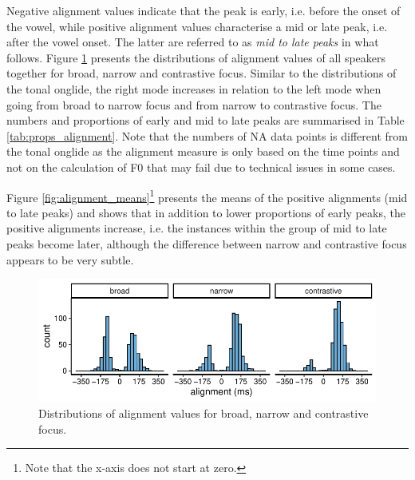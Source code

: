 Negative alignment values indicate that the peak is early, i.e. before the onset of the vowel, while positive alignment values characterise a mid or late peak, i.e. after the vowel onset. The latter are referred to as \emph{mid to late peaks} in what follows. Figure \ref{fig:alignment_distributions_within} presents the distributions of alignment values of all speakers together for broad, narrow and contrastive focus. Similar to the distributions of the tonal onglide, the right mode increases in relation to the left mode when going from broad to narrow focus and from narrow to contrastive focus. The numbers and proportions of early and mid to late peaks are summarised in Table \ref{tab:props_alignment}. Note that the numbers of NA data points is different from the tonal onglide as the alignment measure is only based on the time points and not on the calculation of F0 that may fail due to technical issues in some cases.

Figure \ref{fig:alignment_means}\footnote{Note that the x-axis does not start at zero.} presents the means of the positive alignments (mid to late peaks) and shows that in addition to lower proportions of early peaks, the positive alignments increase, i.e. the instances within the group of mid to late peaks become later, although the difference between narrow and contrastive focus appears to be very subtle.

\begin{figure}[htbp]
\begin{center}
\includegraphics[width=\textwidth]{figures/ch6/alignment_distribution_within.pdf}
\caption{Distributions of alignment values for broad, narrow and contrastive focus.}
\label{fig:alignment_distributions_within}
\end{center}
\end{figure}


